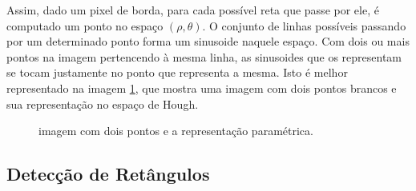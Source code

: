 
Assim, dado um pixel de borda, para cada possível reta que passe por ele, é computado um ponto no espaço $(\rho,\theta)$. O conjunto de linhas possíveis passando por um determinado ponto forma um sinusoide naquele espaço. Com dois ou mais pontos na imagem pertencendo à mesma linha, as sinusoides que os representam se tocam justamente no ponto que representa a mesma. Isto é melhor representado na imagem \ref{houghlinhas}, que mostra uma imagem com dois pontos brancos e sua representação no espaço de Hough.


\begin{figure}[h]
  \centering
  \hfill
  \caption{imagem com dois pontos e a representação paramétrica.}
  \label{houghlinhas}
\end{figure}

\subsection{Detecção de Retângulos} \label{funt:procret}

